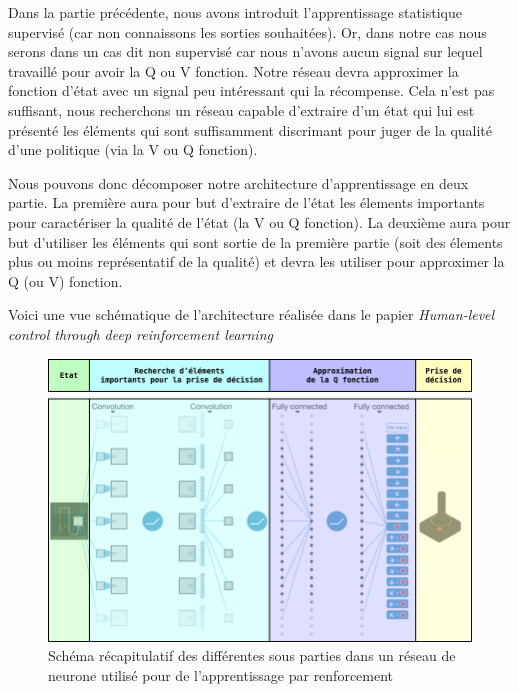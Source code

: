 Dans la partie précédente, nous avons introduit l'apprentissage statistique supervisé (car non connaissons les sorties souhaitées). Or, dans notre cas nous serons dans un cas dit non supervisé car nous n'avons aucun signal sur lequel travaillé pour avoir la Q ou V fonction. Notre réseau devra approximer la fonction d'état avec un signal peu intéressant qui la récompense. Cela n'est pas suffisant, nous recherchons un réseau capable d'extraire d'un état qui lui est présenté les éléments qui sont suffisamment discrimant pour juger de la qualité d'une politique (via la V ou Q fonction).


Nous pouvons donc décomposer notre architecture d'apprentissage en deux partie. La première aura pour but d'extraire de l'état les élements importants pour caractériser la qualité de l'état (la V ou Q fonction). La deuxième aura pour but d'utiliser les éléments qui sont sortie de la première partie (soit des élements plus ou moins représentatif de la qualité) et devra les utiliser pour approximer la Q (ou V) fonction.


Voici une vue schématique de l'architecture réalisée dans le papier \emph{Human-level control through deep reinforcement learning}\cite{mnih-dqn-2015}
\begin{figure}
\begin{center}
    \includegraphics[scale=.5]{./assets/DeepLearning/DP_EX.png}
    \caption{Schéma récapitulatif des différentes sous parties dans un réseau de neurone utilisé pour de l'apprentissage par renforcement}
\end{center}
\end{figure}
